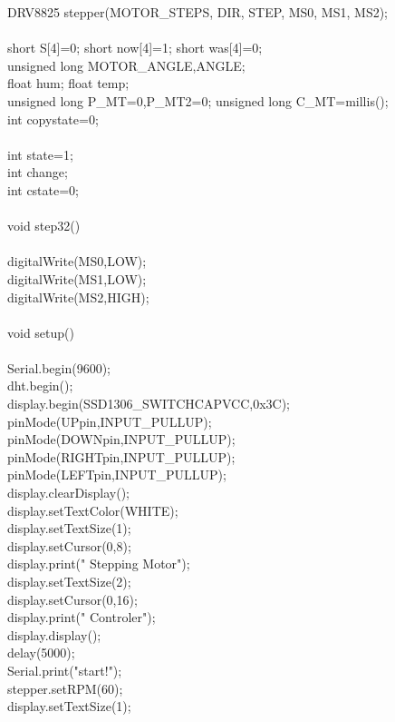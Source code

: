 \begin{verbbox}
{DRV8825 stepper(MOTOR\_STEPS, DIR, STEP, MS0, MS1, MS2);\\
\\
short S[4]={0}; short now[4]={1}; short was[4]={0};\\
unsigned long MOTOR\_ANGLE,ANGLE;\\
float hum; float temp;\\
unsigned long P\_MT=0,P\_MT2=0; unsigned long C\_MT=millis();\\
int copystate=0;\\
\\
int state=1;\\
int change;\\
int cstate=0;\\
\\
void step32()\\
{\\
	digitalWrite(MS0,LOW);\\
	digitalWrite(MS1,LOW);\\
	digitalWrite(MS2,HIGH);\\
}\\
void setup()\\
{\\
	Serial.begin(9600);\\
	dht.begin();\\
	display.begin(SSD1306\_SWITCHCAPVCC,0x3C);\\
	pinMode(UPpin,INPUT\_PULLUP);\\
	pinMode(DOWNpin,INPUT\_PULLUP);\\
	pinMode(RIGHTpin,INPUT\_PULLUP);\\
	pinMode(LEFTpin,INPUT\_PULLUP);\\
	display.clearDisplay();\\
	display.setTextColor(WHITE);\\
	display.setTextSize(1);\\
	display.setCursor(0,8);\\
	display.print("    Stepping Motor");\\
	display.setTextSize(2);\\
	display.setCursor(0,16);\\
	display.print(" Controler");\\
	display.display();\\
	delay(5000);\\
	Serial.print("start!");\\
	stepper.setRPM(60);\\
	display.setTextSize(1);\\
}}
\end{verbbox}
